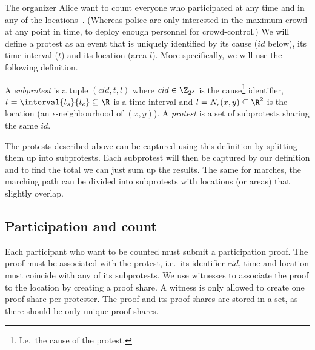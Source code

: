 
The organizer Alice want to count everyone who participated at any time and in 
any of the locations~\cite{2016DemonstrationsInSeoul}.
(Whereas police are only interested in the maximum crowd at any point in time, 
to deploy enough personnel for crowd-control.)
We will define a protest as an event that is uniquely identified by its cause 
(\(id\) below), its time interval (\(t\)) and its location (area \(l\)).
More specifically, we will use the following definition.

\begin{frame}
\begin{definition}[Protest]\label{DefProtest}
  A \emph{subprotest} is a tuple \((cid, t, l)\) where
  \(cid\in \Z_{2^\lambda}\) is the cause\footnote{%
    I.e.\ the cause of the protest.
  } identifier,
  \(t = \interval{t_s}{t_e}\subseteq \R\) is a time interval and
  \(l = N_\epsilon(x, y)\subseteq \R^2\) is the location (an 
  \(\epsilon\)-neighbourhood of \((x,y)\)).
  A \emph{protest} is a set of subprotests sharing the same \(id\).
\end{definition}
\end{frame}

The protests described above can be captured using this definition by splitting 
them up into subprotests.
Each subprotest will then be captured by our definition and to find the total 
we can just sum up the results.
The same for marches, the marching path can be divided into subprotests with 
locations (or areas) that slightly overlap.

\subsection{Participation and count}

Each participant who want to be counted must submit a participation proof.
The proof must be associated with the protest, i.e.\ its identifier \(cid\), 
time and location must coincide with any of its subprotests.
We use witnesses to associate the proof to the location by creating a proof 
share.
A witness is only allowed to create one proof share per protester.
The proof and its proof shares are stored in a set, as there should be only 
unique proof shares.

